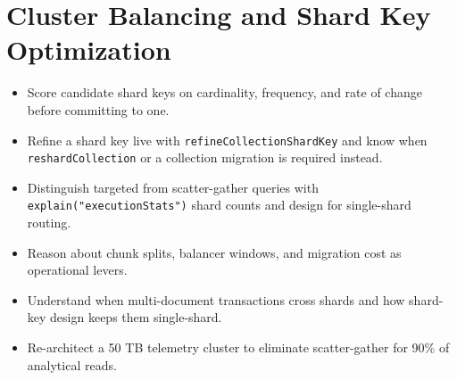 \chapter{Cluster Balancing and Shard Key Optimization}
%

\begin{objectives}
\begin{itemize}
    \item Score candidate shard keys on cardinality, frequency, and rate of change before committing to one.
    \item Refine a shard key live with \texttt{refineCollectionShardKey} and know when \texttt{reshardCollection} or a collection migration is required instead.
    \item Distinguish targeted from scatter-gather queries with \texttt{explain("executionStats")} shard counts and design for single-shard routing.
    \item Reason about chunk splits, balancer windows, and migration cost as operational levers.
    \item Understand when multi-document transactions cross shards and how shard-key design keeps them single-shard.
    \item Re-architect a 50 TB telemetry cluster to eliminate scatter-gather for 90\% of analytical reads.
\end{itemize}
\end{objectives}

